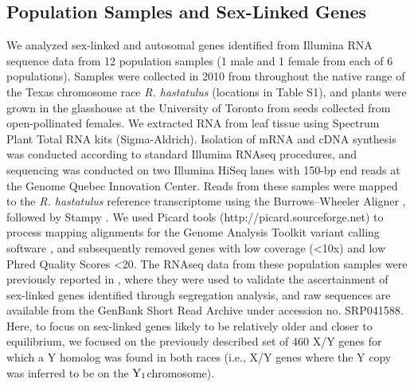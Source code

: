 \documentclass[9pt,twocolumn,twoside,lineno]{gsajnl}
\begin{document}
\subsection*{Population Samples and Sex-Linked Genes}
We analyzed sex-linked and autosomal genes identified from Illumina RNA sequence data from 12 population samples (1 male and 1 female from each of 6 populations). Samples were collected in 2010 from throughout the native range of the Texas chromosome race \textit{R. hastatulus} (locations in Table S1), and plants were grown in the glasshouse at the University of Toronto from seeds collected from open-pollinated females. We extracted RNA from leaf tissue using Spectrum Plant Total RNA kits (Sigma-Aldrich). Isolation of mRNA and cDNA synthesis was conducted according to standard Illumina RNAseq procedures, and sequencing was conducted on two Illumina HiSeq lanes with 150-bp end reads at the Genome Quebec Innovation Center. Reads from these samples were mapped to the \textit{R. hastatulus} reference transcriptome \citep{hough2014} using the Burrows–Wheeler Aligner \citep{li2010fast}, followed by Stampy \citep{lunter2011stampy}. We used Picard tools (http://picard.sourceforge.net) to process mapping alignments for the Genome Analysis Toolkit variant calling software \citep{mckenna2010genome}, and subsequently removed genes with low coverage (<10x) and low Phred Quality Scores <20. The RNAseq data from these population samples were previously reported in \citet{hough2014}, where they were used to validate the ascertainment of sex-linked genes identified through segregation analysis, and raw sequences are available from the GenBank Short Read Archive under accession no. SRP041588. Here, to focus on sex-linked genes likely to be relatively older and closer to equilibrium, we focused on the previously described set of 460 X/Y genes for which a Y homolog was found in both races (i.e., X/Y genes where the Y copy was inferred to be on the $\textnormal{Y}_\textnormal{1}$chromosome).
\end{document}
